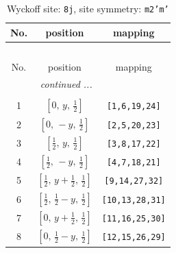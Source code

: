 \documentclass[fleqn,8pt]{jsarticle}
\begin{document}
\begin{longtable}{ccc}
\caption{Wyckoff site: {\tt 8j}, site symmetry: {\tt m2'm'}}
 \\
 \hline \hline
No. & position & mapping \\ \hline \endfirsthead

\multicolumn{2}{l}{\tablename\ \thetable{}} \\
 \hline \hline
No. & position & mapping \\ \hline \endhead

 \hline \hline
\multicolumn{2}{r}{\footnotesize\it continued ...} \\ \endfoot

 \hline \hline
\multicolumn{2}{r}{} \\ \endlastfoot

1 & $\left[ 0,\, y,\, \frac{1}{2} \right]$ & {\tt [1,6,19,24]} \\ \hline
2 & $\left[ 0,\, - y,\, \frac{1}{2} \right]$ & {\tt [2,5,20,23]} \\ \hline
3 & $\left[ \frac{1}{2},\, y,\, \frac{1}{2} \right]$ & {\tt [3,8,17,22]} \\ \hline
4 & $\left[ \frac{1}{2},\, - y,\, \frac{1}{2} \right]$ & {\tt [4,7,18,21]} \\ \hline
5 & $\left[ \frac{1}{2},\, y + \frac{1}{2},\, \frac{1}{2} \right]$ & {\tt [9,14,27,32]} \\ \hline
6 & $\left[ \frac{1}{2},\, \frac{1}{2} - y,\, \frac{1}{2} \right]$ & {\tt [10,13,28,31]} \\ \hline
7 & $\left[ 0,\, y + \frac{1}{2},\, \frac{1}{2} \right]$ & {\tt [11,16,25,30]} \\ \hline
8 & $\left[ 0,\, \frac{1}{2} - y,\, \frac{1}{2} \right]$ & {\tt [12,15,26,29]} \\
\end{longtable}
\renewcommand{\arraystretch}{1.2}
\end{document}
